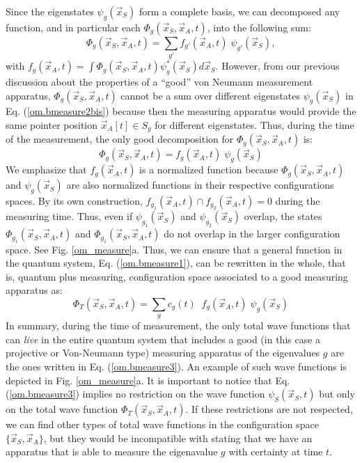 \documentclass[nofootinbib, secnumarabic, amsmath, nobibnotes,11pt,aps,pra, floatfix]{revtex4-1}
\newcommand{\fref}[1]{Fig. \ref{#1}}
\newcommand{\eref}[1]{Eq. (\ref{#1})}
\begin{document}
Since the eigenstates $\psi_g(\vec x_S)$ form a complete basis, we can decomposed any function, and in particular each $\Phi_g(\vec x_S,\vec x_A,t)$, into the following sum:
\begin{equation}
\Phi_g(\vec x_S,\vec x_A,t) = \sum_{g'} f_{g'}(\vec x_A,t) \; \psi_{g'}(\vec x_S)
\label{om.bmeasure2bis},
\end{equation}
with $ f_g(\vec x_A,t) = \int \Phi_g(\vec x_S,\vec x_A,t)
\psi^*_g(\vec x_S) d\vec x_S$. However, from our previous discussion
about the properties of a ``good'' von Neumann measurement
apparatus, $\Phi_g(\vec x_S,\vec x_A,t)$ cannot be a sum over
different eigenstates $\psi_g(\vec x_S)$ in \eref{om.bmeasure2bis}
because then the measuring apparatus would provide the same pointer
position $\vec x_A[t]\in S_{g}$ for different eigenstates. Thus, during the time of the measurement, the
only good decomposition for $\Phi_g(\vec x_S,\vec x_A,t)$ is:
\begin{equation}
\Phi_g(\vec x_S,\vec x_A,t) = f_g(\vec x_A,t) \; \psi_g(\vec x_S)
\label{om.bmeasure2}
\end{equation}
We emphasize that $ f_g(\vec x_A,t)$ is a normalized function because $\Phi_g(\vec x_S,\vec x_A,t)$ and $\psi_g(\vec x_S)$ are also normalized functions in their respective configurations spaces. By its own construction, $f_{g_1}(\vec x_A,t) \cap f_{g_2}(\vec x_A,t) = 0$ during the measuring time. Thus, even if $\psi_{g_1}(\vec x_S)$ and $\psi_{g_2}(\vec x_S)$ overlap, the states $\Phi_{g_1}(\vec x_S,\vec x_A,t)$ and $\Phi_{g_1}(\vec x_S,\vec x_A,t)$ do not overlap in the larger configuration space. See \fref{om_measure}a. Thus, we can ensure that a general function in the quantum system, \eref{om.bmeasure1}, can be rewritten in the whole, that is, quantum plus measuring, configuration space associated to a good measuring apparatus as:
\begin{equation}
\Phi_T(\vec x_S,\vec x_A,t) = \sum_{g} c_g(t) \;\; f_g(\vec x_A,t) \; \psi_g(\vec x_S)
\label{om.bmeasure3}
\end{equation}
In summary, during the time of measurement, the only total wave
functions that can \textit{live} in the entire quantum system that
includes a good (in this case a projective or Von-Neumann type) measuring apparatus of the eigenvalues $g$ are the
ones written in \eref{om.bmeasure3}. An example of such
wave functions is depicted in \fref{om_measure}a. It is important to
notice that \eref{om.bmeasure3} implies no restriction on the wave
function $\psi_S(\vec x_S,t)$ but only on the total wave function
$\Phi_T(\vec x_S,\vec x_A,t)$. If these restrictions are not
respected, we can find other types of total wave functions in the
configuration space $\{\vec x_S,\vec x_A\}$, but they would be
incompatible with stating that we have an apparatus that is able to
measure the eigenavalue $g$ with certainty at time $t$.
\end{document}
